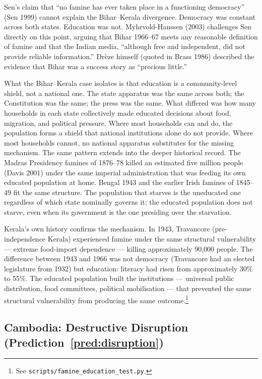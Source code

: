\documentclass[12pt,letterpaper]{article}
\begin{document}
Sen's claim that ``no famine has ever taken place in a functioning democracy'' (Sen 1999) cannot explain the Bihar--Kerala divergence. Democracy was constant across both states. Education was not. Myhrvold-Hanssen (2003) challenges Sen directly on this point, arguing that Bihar 1966--67 meets any reasonable definition of famine and that the Indian media, ``although free and independent, did not provide reliable information.'' Drèze himself (quoted in Brass 1986) described the evidence that Bihar was a success story as ``precious little.''

What the Bihar--Kerala case isolates is that education is a
community-level shield, not a national one. The state apparatus was
the same across both; the Constitution was the same; the press was
the same. What differed was how many households in each state
collectively made educated decisions about food, migration, and
political pressure. Where most households can and do, the population
forms a shield that national institutions alone do not provide. Where
most households cannot, no national apparatus substitutes for the
missing mechanism. The same pattern extends into the deeper
historical record. The Madras Presidency famines of 1876--78 killed
an estimated five million people (Davis 2001) under the same imperial
administration that was feeding its own educated population at home.
Bengal 1943 and the earlier Irish famines of 1845--49 fit the same
structure. The population that starves is the uneducated one
regardless of which state nominally governs it; the educated
population does not starve, even when its government is the one
presiding over the starvation.

Kerala's own history confirms the mechanism. In 1943, Travancore (pre-independence Kerala) experienced famine under the same structural vulnerability --- extreme food-import dependence --- killing approximately 90,000 people. The difference between 1943 and 1966 was not democracy (Travancore had an elected legislature from 1932) but education: literacy had risen from approximately 30\% to 55\%. The educated population built the institutions --- universal public distribution, food committees, political mobilisation --- that prevented the same structural vulnerability from producing the same outcome.\footnote{See \texttt{scripts/famine\_education\_test.py}.}

\subsection{Cambodia: Destructive Disruption (Prediction~\ref{pred:disruption})}\label{cambodia-the-pt-shadow}
\end{document}
